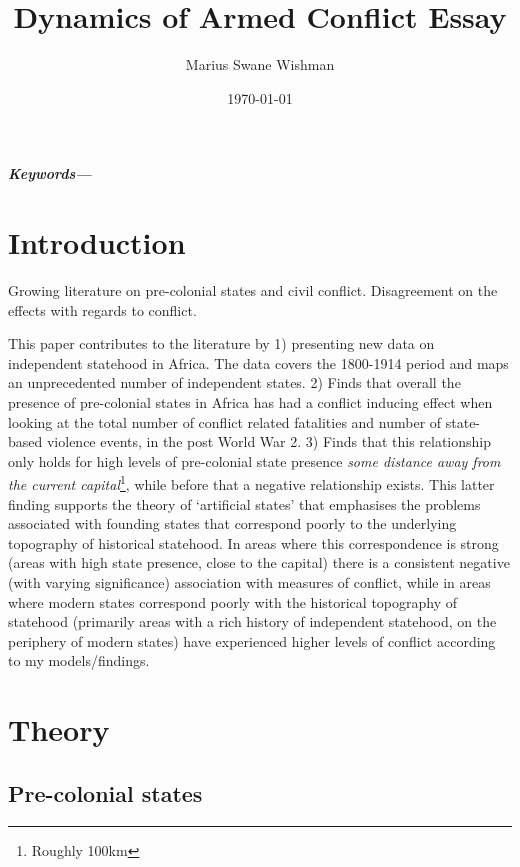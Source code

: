 \documentclass[12pt]{article}
\title{Dynamics of Armed Conflict Essay}
\author[1]{Marius Swane Wishman}
\affil[1]{Department of Sociology and Political Science, NTNU}
\date{\today}
\providecommand{\keywords}[1]
{
	\small	
	\textbf{\textit{Keywords---}} #1
}
\begin{document}
\maketitle

\begin{abstract}

\end{abstract}

\keywords{}

\pagebreak


\onehalfspacing

\section{Introduction}

Growing literature on pre-colonial states and civil conflict. Disagreement on
the effects with regards to conflict.

This paper contributes to the literature by 1) presenting new data on
independent statehood in Africa. The data covers the 1800-1914 period and maps
an unprecedented number of independent states. 2) Finds that overall the
presence of pre-colonial states in Africa has had a conflict inducing effect
when looking at the total number of conflict related fatalities and number of
state-based violence events, in the post World War 2. 3) Finds that this
relationship only holds for high levels of pre-colonial state presence
\textit{some distance away from the current capital}\footnote{Roughly 100km},
while before that a negative relationship exists. This latter finding supports
the theory of `artificial states' that emphasises the problems associated with
founding states that correspond poorly to the underlying topography of
historical statehood. In areas where this correspondence is strong (areas with
high state presence, close to the capital) there is a consistent negative (with
varying significance) association with measures of conflict, while in areas
where modern states correspond poorly with the historical topography of
statehood (primarily areas with a rich history of independent statehood, on the
periphery of modern states) have experienced higher levels of conflict according
to my models/findings.

\section{Theory}

\subsection{Pre-colonial states}
\end{document}
